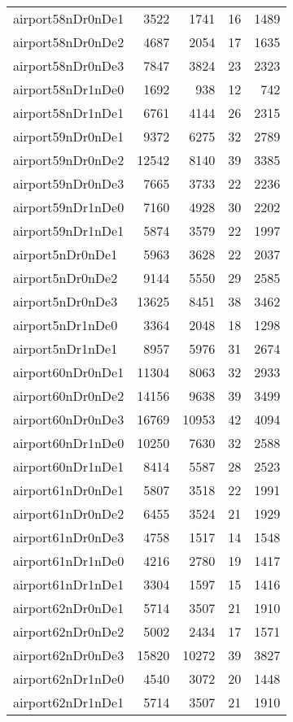 \begin{longtable}{lrrrr}
airport58nDr0nDe1 & 3522 & 1741 & 16 & 1489 \\
airport58nDr0nDe2 & 4687 & 2054 & 17 & 1635 \\
airport58nDr0nDe3 & 7847 & 3824 & 23 & 2323 \\
airport58nDr1nDe0 & 1692 & 938 & 12 & 742 \\
airport58nDr1nDe1 & 6761 & 4144 & 26 & 2315 \\
airport59nDr0nDe1 & 9372 & 6275 & 32 & 2789 \\
airport59nDr0nDe2 & 12542 & 8140 & 39 & 3385 \\
airport59nDr0nDe3 & 7665 & 3733 & 22 & 2236 \\
airport59nDr1nDe0 & 7160 & 4928 & 30 & 2202 \\
airport59nDr1nDe1 & 5874 & 3579 & 22 & 1997 \\
airport5nDr0nDe1 & 5963 & 3628 & 22 & 2037 \\
airport5nDr0nDe2 & 9144 & 5550 & 29 & 2585 \\
airport5nDr0nDe3 & 13625 & 8451 & 38 & 3462 \\
airport5nDr1nDe0 & 3364 & 2048 & 18 & 1298 \\
airport5nDr1nDe1 & 8957 & 5976 & 31 & 2674 \\
airport60nDr0nDe1 & 11304 & 8063 & 32 & 2933 \\
airport60nDr0nDe2 & 14156 & 9638 & 39 & 3499 \\
airport60nDr0nDe3 & 16769 & 10953 & 42 & 4094 \\
airport60nDr1nDe0 & 10250 & 7630 & 32 & 2588 \\
airport60nDr1nDe1 & 8414 & 5587 & 28 & 2523 \\
airport61nDr0nDe1 & 5807 & 3518 & 22 & 1991 \\
airport61nDr0nDe2 & 6455 & 3524 & 21 & 1929 \\
airport61nDr0nDe3 & 4758 & 1517 & 14 & 1548 \\
airport61nDr1nDe0 & 4216 & 2780 & 19 & 1417 \\
airport61nDr1nDe1 & 3304 & 1597 & 15 & 1416 \\
airport62nDr0nDe1 & 5714 & 3507 & 21 & 1910 \\
airport62nDr0nDe2 & 5002 & 2434 & 17 & 1571 \\
airport62nDr0nDe3 & 15820 & 10272 & 39 & 3827 \\
airport62nDr1nDe0 & 4540 & 3072 & 20 & 1448 \\
airport62nDr1nDe1 & 5714 & 3507 & 21 & 1910 \\

\end{longtable}
